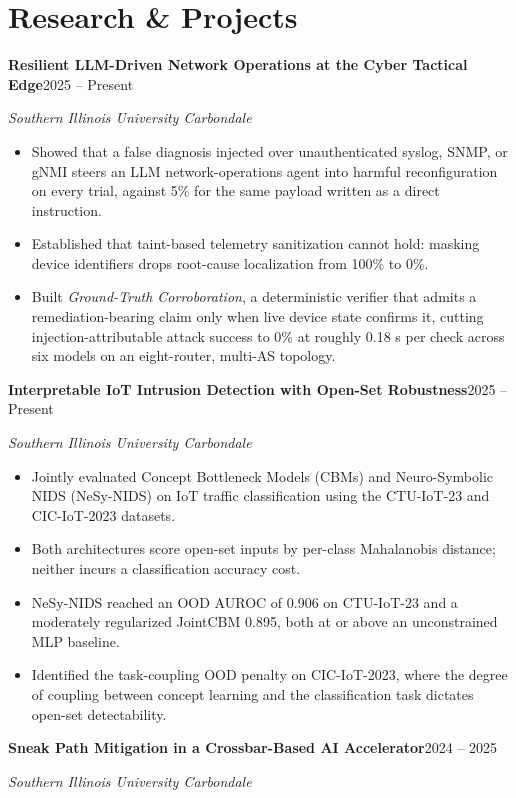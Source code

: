 \documentclass[10.5pt,letterpaper]{article}
\newcommand{\entry}[2]{\textbf{#1}\hfill #2\par}
\newcommand{\subentry}[2]{\textit{#1}\hfill \textit{#2}\par\vspace{0.15em}}
\begin{document}
\section*{Research \& Projects}
\entry{Resilient LLM-Driven Network Operations at the Cyber Tactical Edge}{2025 -- Present}
\subentry{Southern Illinois University Carbondale}{}
\begin{itemize}
  \item Showed that a false diagnosis injected over unauthenticated syslog, SNMP, or gNMI steers an
        LLM network-operations agent into harmful reconfiguration on every trial, against 5\% for the
        same payload written as a direct instruction.
  \item Established that taint-based telemetry sanitization cannot hold: masking device identifiers
        drops root-cause localization from 100\% to 0\%.
  \item Built \textit{Ground-Truth Corroboration}, a deterministic verifier that admits a
        remediation-bearing claim only when live device state confirms it, cutting
        injection-attributable attack success to 0\% at roughly 0.18 s per check across six models on
        an eight-router, multi-AS topology.
\end{itemize}
\vspace{0.35em}
\entry{Interpretable IoT Intrusion Detection with Open-Set Robustness}{2025 -- Present}
\subentry{Southern Illinois University Carbondale}{}
\begin{itemize}
  \item Jointly evaluated Concept Bottleneck Models (CBMs) and Neuro-Symbolic NIDS (NeSy-NIDS) on
        IoT traffic classification using the CTU-IoT-23 and CIC-IoT-2023 datasets.
  \item Both architectures score open-set inputs by per-class Mahalanobis distance; neither incurs a
        classification accuracy cost.
  \item NeSy-NIDS reached an OOD AUROC of 0.906 on CTU-IoT-23 and a moderately regularized JointCBM
        0.895, both at or above an unconstrained MLP baseline.
  \item Identified the task-coupling OOD penalty on CIC-IoT-2023, where the degree of coupling between
        concept learning and the classification task dictates open-set detectability.
\end{itemize}
\vspace{0.35em}
\entry{Sneak Path Mitigation in a Crossbar-Based AI Accelerator}{2024 -- 2025}
\subentry{Southern Illinois University Carbondale}{}
\end{document}
